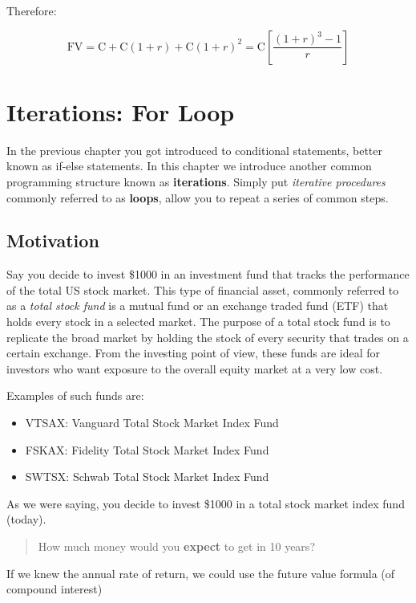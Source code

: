 \documentclass[
]{book}
\begin{document}
Therefore:

\[
\text{FV} = \text{C} + \text{C} (1 + r) + \text{C} (1 + r)^2 = \text{C} \left[ \frac{(1+r)^3 -1}{r} \right]
\]

\hypertarget{for-loop}{%
\chapter{Iterations: For Loop}\label{for-loop}}

In the previous chapter you got introduced to conditional statements, better
known as if-else statements. In this chapter we introduce another common
programming structure known as \textbf{iterations}. Simply put \emph{iterative procedures}
commonly referred to as \textbf{loops}, allow you to repeat a series of common steps.

\hypertarget{motivation-3}{%
\section{Motivation}\label{motivation-3}}

Say you decide to invest \$1000 in an investment fund that tracks the
performance of the total US stock market. This type of financial asset, commonly
referred to as a \emph{total stock fund} is a mutual fund or an exchange traded fund
(ETF) that holds every stock in a selected market. The purpose of a total stock
fund is to replicate the broad market by holding the stock of every security
that trades on a certain exchange. From the investing point of view, these funds
are ideal for investors who want exposure to the overall equity market at a
very low cost.

Examples of such funds are:

\begin{itemize}
\item
  VTSAX: Vanguard Total Stock Market Index Fund
\item
  FSKAX: Fidelity Total Stock Market Index Fund
\item
  SWTSX: Schwab Total Stock Market Index Fund
\end{itemize}

As we were saying, you decide to invest \$1000 in a total stock market index
fund (today).

\begin{quote}
How much money would you \textbf{expect} to get in 10 years?
\end{quote}

If we knew the annual rate of return, we could use the future value formula
(of compound interest)
\end{document}
